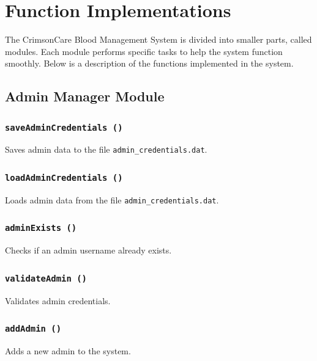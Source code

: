 \documentclass[12pt,a4paper]{report}
\begin{document}
\section{Function Implementations}
The CrimsonCare Blood Management System is divided into smaller parts, called modules.
Each module performs specific tasks to help the system function smoothly.
Below is a description of the functions implemented in the system.

\subsection{Admin Manager Module}
\subsubsection{\texttt{saveAdminCredentials ()}}
Saves admin data to the file \texttt{admin\_credentials.dat}.


\subsubsection{\texttt{loadAdminCredentials ()}}
Loads admin data from the file \texttt{admin\_credentials.dat}.


\subsubsection{\texttt{adminExists ()}}
Checks if an admin username already exists.


\subsubsection{\texttt{validateAdmin ()}}
Validates admin credentials.


\subsubsection{\texttt{addAdmin ()}}
Adds a new admin to the system.

\end{document}

